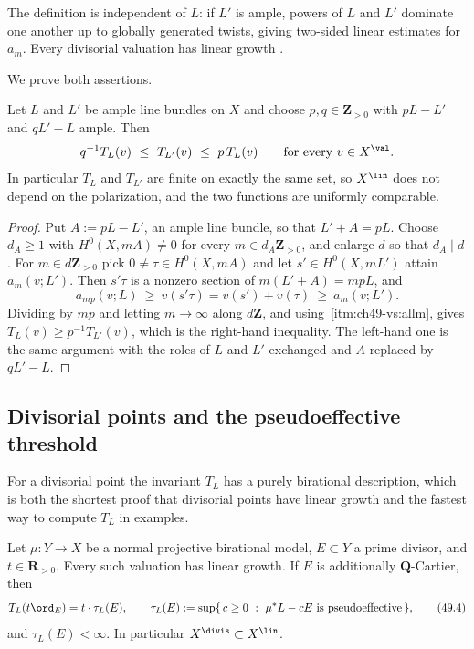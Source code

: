 The definition is independent of $L$: if $L'$ is ample, powers of $L$
and $L'$ dominate one another up to globally generated twists, giving
two-sided linear estimates for $a_m$.  Every divisorial valuation has
linear growth \cite[Proposition~1.28]{BJ22}.

We prove both assertions.

\begin{proposition}
\label{prop:ch49-change-polarization}
Let $L$ and $L'$ be ample line bundles on $X$ and choose
$p,q\in\mathbf Z_{>0}$ with $pL-L'$ and $qL'-L$ ample.  Then
\[
 q^{-1}T_L(v)\ \le\ T_{L'}(v)\ \le\ p\,T_L(v)
 \qquad\text{for every }v\in X^{\val}.
\]
In particular $T_L$ and $T_{L'}$ are finite on exactly the same set, so
$X^{\lin}$ does not depend on the polarization, and the two functions are
uniformly comparable.
\end{proposition}

\begin{proof}
Put $A:=pL-L'$, an ample line bundle, so that $L'+A=pL$.  Choose
$d_A\ge1$ with $H^0(X,mA)\ne0$ for every $m\in d_A\mathbf Z_{>0}$,
and enlarge $d$ so that $d_A\mid d$.  For $m\in d\mathbf Z_{>0}$
pick $0\ne\tau\in H^0(X,mA)$ and let $s'\in H^0(X,mL')$ attain
$a_m(v;L')$.  Then $s'\tau$ is a nonzero section of
$m(L'+A)=mpL$, and
\[
 a_{mp}(v;L)\ \ge\ v(s'\tau)=v(s')+v(\tau)\ \ge\ a_m(v;L') .
\]
Dividing by $mp$ and letting $m\to\infty$ along $d\mathbf Z$, and
using \,\cref{itm:ch49-vs:allm}, gives
$T_L(v)\ge p^{-1}T_{L'}(v)$, which is the right-hand inequality.  The
left-hand one is the same argument with the roles of $L$ and $L'$
exchanged and $A$ replaced by $qL'-L$.
\end{proof}

\subsection{Divisorial points and the pseudoeffective threshold}
\label{sec:ch49-psef}

For a divisorial point the invariant $T_L$ has a purely birational
description, which is both the shortest proof that divisorial points have
linear growth and the fastest way to compute $T_L$ in examples.

\begin{proposition}
\label{prop:ch49-psef-threshold}
Let $\mu:Y\to X$ be a normal projective birational model, $E\subset Y$
a prime divisor, and $t\in\mathbf R_{>0}$.  Every such valuation has linear growth.  If $E$ is additionally
$\mathbf Q$-Cartier, then
\[
 T_L(t\ord_E)=t\cdot\tau_L(E),
 \qquad
 \tau_L(E):=\sup\{\,c\ge0\ :\ \mu^*L-cE\ \text{is pseudoeffective}\,\},
\tag{49.4}\label{eq:ch49-psef-threshold}
\]
and $\tau_L(E)<\infty$.  In particular $X^{\divis}\subset X^{\lin}$.
\end{proposition}

